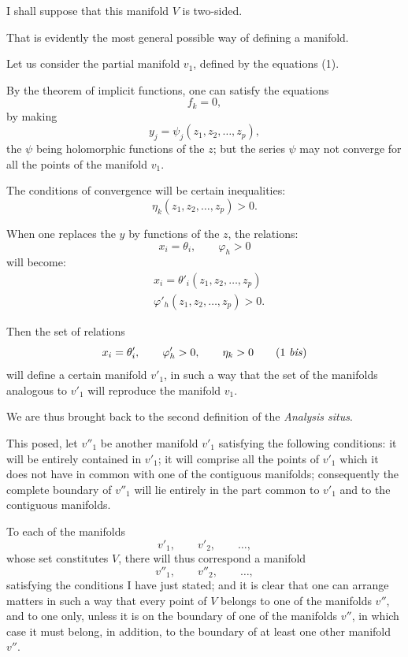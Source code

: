 \documentclass{article}
\begin{document}
I shall suppose that this manifold $V$ is two-sided.

That is evidently the most general possible way of defining a manifold.

Let us consider the partial manifold $v_{1}$, defined by the equations (1).

By the theorem of implicit functions, one can satisfy the equations
\[ f_{k} = 0, \]
by making
\[ y_{j} = \psi_{j}(z_{1}, z_{2}, \ldots, z_{p}), \]
the $\psi$ being holomorphic functions of the $z$; but the series $\psi$ may not converge for all the points of the manifold $v_{1}$.

The conditions of convergence will be certain inequalities:
\[ \eta_{k}(z_{1}, z_{2}, \ldots, z_{p}) > 0. \]

When one replaces the $y$ by functions of the $z$, the relations:
\[ x_{i} = \theta_{i}, \qquad \varphi_{h} > 0 \]
will become:
\[ \begin{aligned} &x_{i} = \theta'_{i}(z_{1}, z_{2}, \ldots, z_{p})\\ &\varphi'_{h}(z_{1}, z_{2}, \ldots, z_{p}) > 0. \end{aligned} \]

Then the set of relations
\[ x_{i} = \theta'_{i}, \qquad \varphi'_{h} > 0, \qquad \eta_{k} > 0 \tag{1 \textit{bis}} \]
will define a certain manifold $v'_{1}$, in such a way that the set of the manifolds analogous to $v'_{1}$ will reproduce the manifold $v_{1}$.


We are thus brought back to the second definition of the \emph{Analysis situs}.

This posed, let $v''_{1}$ be another manifold $v'_{1}$ satisfying the following conditions: it will be entirely contained in $v'_{1}$; it will comprise all the points of $v'_{1}$ which it does not have in common with one of the contiguous manifolds; consequently the complete boundary of $v''_{1}$ will lie entirely in the part common to $v'_{1}$ and to the contiguous manifolds.

To each of the manifolds
\[ v'_{1}, \qquad v'_{2}, \qquad \ldots, \]
whose set constitutes $V$, there will thus correspond a manifold
\[ v''_{1}, \qquad v''_{2}, \qquad \ldots, \]
satisfying the conditions I have just stated; and it is clear that one can arrange matters in such a way that every point of $V$ belongs to one of the manifolds $v''$, and to one only, unless it is on the boundary of one of the manifolds $v''$, in which case it must belong, in addition, to the boundary of at least one other manifold $v''$.
\end{document}
